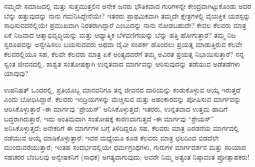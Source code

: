 
\newpage
\begin{mananam}{}
\nfntmtxt ನಮ್ಮದೇ ಸಮಾಜದಲ್ಲಿ ಮತ್ತು ಸುತ್ತಮುತ್ತಲಿನ ಅನೇಕ ಜನರು ಭೌತಿಕವಾದ ಗುರಿಗಳನ್ನೇ ಕೇಂದ್ರವಾಗಿಟ್ಟುಕೊಂಡು ಅದರ ಬೆನ್ನು ಹತ್ತುವುದನ್ನು ನಾನು ಗಮನಿಸಿದ್ದೇನೆಯೇ? ಇತರರು ಪ್ರಾಥಮಿಕವಾಗಿ ತಮ್ಮದೇ ಕ್ಷೇತ್ರಗಳಲ್ಲಿ ವೈಯಕ್ತಿಕ ಯಶಸ್ಸನ್ನು ಸಾಧಿಸುವದರಲ್ಲಿಯೇ ಪ್ರಮುಖವಾಗಿ ನಿರತರಾಗಿದ್ದಾರೆ ಎಂಬುದನ್ನು ನಾನು ನೋಡಬಹುದೇ? ಕೇವಲ ಕೆಲವರು ಮಾತ್ರ ಏಕೆ ನಿಜವಾದ ಆತ್ಮಾಭಿವೃದ್ಧಿಯನ್ನು ಮತ್ತು ಆಧ್ಯಾತ್ಮಿಕ ಬೆಳವಣಿಗೆಯನ್ನು ಬೆನ್ನು ಹತ್ತಿ ಹೋಗುತ್ತಾರೆ? ತಮ್ಮ ನಿಜ ಸ್ವರೂಪವನ್ನು ಅನ್ವೇಷಿಸಲು ಬಯಸುವವರು ಅಥವಾ ದೈವೀ ಸಂಪರ್ಕ ಹೊಂದಲು ಪ್ರಯತ್ನ ಮಾಡುತ್ತಿರುವ ಕೆಲವೇ ಕೆಲವರಲ್ಲಿಯೂ ಸಹ, ಕೆಲವೇ ಕೆಲವರು ಮಾತ್ರ ಏಕೆ ಅಂತ್ಯದವರೆಗೆ ತಮ್ಮ ಅವಿರತ ಪ್ರಯತ್ನ ನಿಭಾಯಿಸುತ್ತಾರೆ? ನನ್ನ ಸ್ವಂತ ಜೀವನದಲ್ಲಿ, ಶಾಶ್ವತ ಸಂತೋಷಕ್ಕಾಗಿ ಉನ್ನತವಾದ ಮಾರ್ಗವನ್ನು ಆರಿಸುವುದನ್ನು ತಡೆಯುವ ಅಡೆತಡೆಗಳು ಯಾವುವು?
\end{mananam}
\sReflect
\begin{inspiration}{}
\nfntmtxt \footnotesize ಉಪನಿಷತ್ ಒಂದರಲ್ಲಿ, ಪ್ರತಿಯೊಬ್ಬ ಮಾನವನಿಗೂ ತನ್ನ ಜೀವನದ ದಾರಿಯನ್ನು ಕಂಡುಕೊಳ್ಳುವ ಆಯ್ಕೆ ಇರುತ್ತದೆ ಎಂದು ಬೋಧಿಸಿದ್ದಾರೆ. ಕೆಲವರು ಇಂದ್ರಿಯಗಳನ್ನು ಮೆಚ್ಚಿಸುವ ಮತ್ತು ಅಹಂಕಾರವನ್ನು ಪೋಷಿಸುವ ಮಾರ್ಗವನ್ನು ಆರಿಸಿಕೊಳ್ಳುತ್ತಾರೆ -ಈ ಮಾರ್ಗವು ‘ಪ್ರೇಯಸ್’ ಅನಿಸಿಕೊಳ್ಳುತ್ತದೆ; ಇತರರು, ಉನ್ನತವಾದ ಉತ್ತಮ ಹಾದಿಗೆ ಬದ್ಧರಾಗಿರುತ್ತಾರೆ, ಇದು ಅಂತಿಮವಾಗಿ ಸಂತೋಷಕ್ಕೆ ಕಾರಣವಾಗುತ್ತದೆ -ಈ ಮಾರ್ಗವು “ಶ್ರೇಯಸ್” ಅನಿಸಿಕೊಳ್ಳುತ್ತದೆ; ಅನೇಕರಿಗೆ ಈ ಮಾರ್ಗಗಳ ಬಗ್ಗೆ ತಿಳಿದಿದ್ದರೂ ಸಹ, ಕೆಲವರು ಮಾತ್ರ ಎರಡನೆಯ ಮಾರ್ಗದಲ್ಲಿ ನಡೆಯುವ ಆಯ್ಕೆ ಮಾಡಿಕೊಳ್ಳುತ್ತಾರೆ; ಇವರ ಮಧ್ಯೆಯೂ ಕೂಡ ಕೆಲವರು ಮಾತ್ರ ಛಲದಿಂದ ಬಿಡದೆಲೇ ಮುಂದುವರೆಯುತ್ತಾರೆ; ಇಂತಹ ಸಂದರ್ಭದಲ್ಲಿಯೇ ಧರ್ಮಗ್ರಂಥಗಳು, ಗುರುಗಳ ಮಾರ್ಗದರ್ಶನ ಮತ್ತು ಸರಿಯಾದ ಸಹಚರರ ಬೆಂಬಲವು ಅನ್ವೇಷಕನಿಗೆ (ಸಾಧಕ) ಅಗತ್ಯವಾಗುವುದು; ಅವರೇ ನಿಮ್ಮ ಅತ್ಯಂತ ನಿಷ್ಠಾವಂತ    ಪ್ರೋತ್ಸಾಹಕರು!
\end{inspiration}
\newpage

